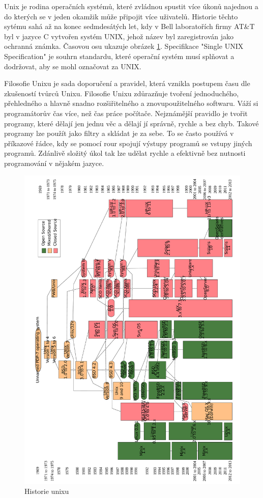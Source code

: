 \documentclass[thesis=M,czech]{FITthesis}[2012/06/26]
\begin{document}
Unix je rodina operačních systémů, které zvládnou spustit více úkonů najednou a do kterých se v jeden okamžik může připojit více uživatelů. Historie těchto sytému sahá až na konec sedmdesátých let, kdy v Bell laboratořích firmy AT\&T byl v jazyce C vytvořen systém UNIX, jehož název byl zaregistrován jako ochranná známka. Časovou osu ukazuje obrázek \ref{fig:unixhistory}. Specifikace "Single UNIX Specification" je souhrn standardu, které operační systém musí splňovat a dodržovat, aby se mohl označovat za UNIX.

Filosofie Unixu je sada doporučení a pravidel, která vznikla postupem času dle zkušeností tvůrců Unixu. Filosofie Unixu zdůrazňuje tvoření jednoduchého, přehledného a hlavně snadno rozšiřitelného a znovupoužitelného softwaru. Váží si programátorův čas více, než čas práce počítače. Nejznámější pravidlo je tvořit programy, které dělají jen jednu věc a dělají jí správně, rychle a bez chyb. Takové programy lze použít jako filtry a skládat je za sebe. To se často používá v příkazové řádce, kdy se pomocí rour spojují výstupy programů se vstupy jiných programů. Zdánlivě složitý úkol tak lze udělat rychle a efektivně bez nutnosti programování v nějakém jazyce.


\begin{figure}
	\includegraphics[width=1.0\textwidth]{./images/Unix_history-simple_rot_big}
	\caption{Historie unixu}
	\label{fig:unixhistory}
\end{figure}
\end{document}
